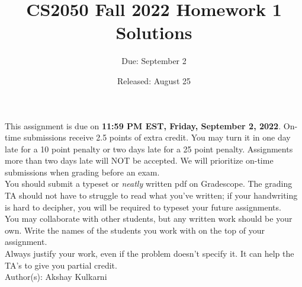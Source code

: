 \documentclass{article}
\title{CS2050 Fall 2022 Homework 1 Solutions}
\author{Due: September 2}
\date{Released: August 25}
\begin{document}
\maketitle

This assignment is due on \textbf{11:59 PM EST, Friday, September 2, 2022}.  On-time submissions receive 2.5 points of extra credit. You may turn it in one day late for a 10 point penalty or two days late for a 25 point penalty. Assignments more than two days late will NOT be accepted.  We will prioritize on-time submissions when grading before an exam. \\ 

You should submit a typeset or \emph{neatly} written pdf on Gradescope.  The grading TA should not have to struggle to read what you've written; if your handwriting is hard to decipher, you will be required to typeset your future assignments.\\ 

You may collaborate with other students, but any written work should be your own. Write the names of the students you work with on the top of your assignment.\\

Always justify your work, even if the problem doesn't specify it. It can help the TA's to give you partial credit.
\\

Author(s): Akshay Kulkarni

\clearpage
\end{document}
